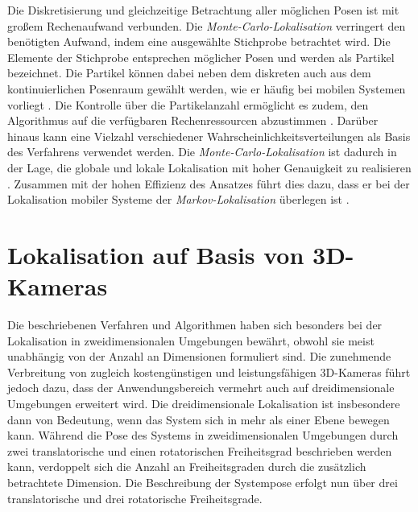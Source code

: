 Die Diskretisierung und gleichzeitige Betrachtung aller möglichen Posen ist mit großem Rechenaufwand verbunden. Die \textit{Monte-Carlo-Lokalisation} verringert den benötigten Aufwand, indem eine ausgewählte Stichprobe betrachtet wird. Die Elemente der Stichprobe entsprechen möglicher Posen und werden als Partikel bezeichnet. Die Partikel können dabei neben dem diskreten auch aus dem kontinuierlichen Posenraum gewählt werden, wie er häufig bei mobilen Systemen vorliegt \cite{Fox2001}. Die Kontrolle über die Partikelanzahl ermöglicht es zudem, den Algorithmus auf die verfügbaren Rechenressourcen abzustimmen \cite{Thrun2001}. Darüber hinaus kann eine Vielzahl verschiedener Wahrscheinlichkeitsverteilungen als Basis des Verfahrens verwendet werden. Die \textit{Monte-Carlo-Lokalisation} ist dadurch in der Lage, die globale und lokale Lokalisation mit hoher Genauigkeit zu realisieren \cite{Thrun2005}. Zusammen mit der hohen Effizienz des Ansatzes führt dies dazu, dass er bei der Lokalisation mobiler Systeme der \textit{Markov-Lokalisation} überlegen ist \cite{Fox2001}.



\prever{
}

\prever{
}
\section{Lokalisation auf Basis von 3D-Kameras}
Die beschriebenen Verfahren und Algorithmen haben sich besonders bei der Lokalisation in zweidimensionalen Umgebungen bewährt, obwohl sie meist unabhängig von der Anzahl an Dimensionen formuliert sind. Die zunehmende Verbreitung von zugleich kostengünstigen und leistungsfähigen 3D-Kameras führt jedoch dazu, dass der Anwendungsbereich vermehrt auch auf dreidimensionale Umgebungen erweitert wird. Die dreidimensionale Lokalisation ist insbesondere dann von Bedeutung, wenn das System sich in mehr als einer Ebene bewegen kann. Während die Pose des Systems in zweidimensionalen Umgebungen durch zwei translatorische und einen rotatorischen Freiheitsgrad beschrieben werden kann, verdoppelt sich die Anzahl an Freiheitsgraden durch die zusätzlich betrachtete Dimension. Die Beschreibung der Systempose erfolgt nun über drei translatorische und drei rotatorische Freiheitsgrade.\\

